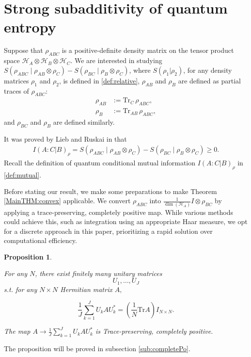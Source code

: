 \documentclass{article}
\numberwithin{equation}{section}
\newtheorem{proposition}[theorem]{Proposition}
\begin{document}
\section{Strong subadditivity of quantum entropy}\label{sec:Mutual}
Suppose that $\rho_{ABC}$ is a positive-definite density matrix on the tensor product space $\mathcal{H}_A \otimes \mathcal{H}_B \otimes \mathcal{H}_C$.
We are interested in studying $S(\rho_{ABC} \mid \rho_{AB} \otimes \rho_C)-S(\rho_{BC} \mid \rho_{B} \otimes \rho_C)$, 
where $S(\rho_1|\rho_2)$, for any density matrices $\rho_1$ and $\rho_2$, is defined in \eqref{def:relative}, $\rho_{AB}$ and $\rho_B$ are defined as partial traces of $\rho_{ABC}:$
\begin{align*}
    \rho_{AB} &:= \text{Tr}_C \, \rho_{ABC}, \\
    \rho_B &:= \text{Tr}_{AB} \, \rho_{ABC},
\end{align*} and $\rho_{BC}$ and $\rho_{B}$ are defined similarly. 

It was proved by Lieb and Ruskai in \cite{LiebRuskai1973} that 
\begin{align}
    I(A:C|B)_\rho=S(\rho_{ABC} \mid \rho_{AB} \otimes \rho_C)- S(\rho_{BC} \mid \rho_{B} \otimes \rho_C)\geq 0.
\end{align} Recall the definition of quantum conditional mutual information $I(A:C|B)_\rho$ in \eqref{def:mutual}.

Before stating our result, we make some preparations to make Theorem \ref{MainTHM:convex} applicable.
We convert $\rho_{ABC}$ into $\frac{1}{\dim(\mathcal{H}_A)} I \otimes \rho_{BC}$ by applying a trace-preserving, completely positive map. While various methods could achieve this, such as integration using an appropriate Haar measure, we opt for a discrete approach in this paper, prioritizing a rapid solution over computational efficiency.



\begin{proposition}\label{prop:completelyPostive}
  
For any $N$, there exist finitely many unitary matrices
$$U_1, \dots, U_J $$ s.t. for any $ N \times N$ Hermitian matrix $A,$

$$\frac{1}{J} \sum_{k=1}^J U_k A U_k^* = \left( \frac{1}{N} \text{Tr} A \right) I_{N \times N}.$$

The map $A \rightarrow\frac{1}{J} \sum_{k=1}^J U_k A U_k^*$ is Trace-preserving, completely positive.
\end{proposition}
The proposition will be proved in subsection \ref{sub:completePo}.
\end{document}
